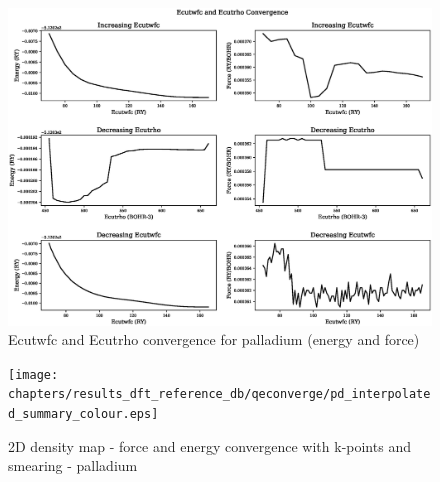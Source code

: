 \begin{landscape}
\FloatBarrier
\begin{figure}
    \begin{center}
        \includegraphics[scale=0.70]{chapters/results_dft_reference_db/qeconverge/pd_ecut_convergence_ry.eps}
        \caption{Ecutwfc and Ecutrho convergence for palladium (energy and force)}
      \label{image:palladiumecut}
    \end{center}
\end{figure}
\FloatBarrier
\end{landscape}

\clearpage

\begin{landscape}
\FloatBarrier
\begin{figure}
    \begin{center}
        \texttt{[image: chapters/results\_dft\_reference\_db/qeconverge/pd\_interpolated\_summary\_colour.eps]}
        \caption{2D density map - force and energy convergence with k-points and smearing - palladium}
      \label{image:palladiumkpointsmearing}
    \end{center}
\end{figure}
\FloatBarrier
\end{landscape}
\clearpage


